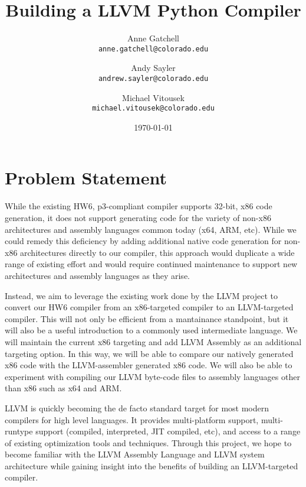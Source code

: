 \documentclass[11pt]{article}
\begin{document}
\title{
  Building a LLVM Python Compiler
}

\author{
  Anne Gatchell    \\ \texttt{anne.gatchell@colorado.edu} \and
  Andy Sayler      \\ \texttt{andrew.sayler@colorado.edu} \and
  Michael Vitousek \\ \texttt{michael.vitousek@colorado.edu}
}

\date{\today}

\maketitle

\section{Problem Statement}

While the existing HW6, p3-compliant compiler supports 32-bit, x86
code generation, it does not support generating code for the variety
of non-x86 architectures and assembly languages common today (x64,
ARM, etc). While we could remedy this deficiency by adding additional
native code generation for non-x86 architectures directly to our
compiler, this approach would duplicate a wide range of existing
effort and would require continued maintenance to support new
architectures and assembly languages as they arise.

Instead, we aim to leverage the existing work done by the LLVM project
\cite{llvm.org} to convert our HW6 compiler from an x86-targeted
compiler to an LLVM-targeted compiler. This will not only be efficient
from a mantainance standpoint, but it will also be a useful
introduction to a commonly used intermediate language. We will
maintain the current x86 targeting and add LLVM
Assembly\cite{lattner-llvmlangref} as an additional targeting
option. In this way, we will be able to compare our natively generated
x86 code with the LLVM-assembler generated x86 code. We will also be
able to experiment with compiling our LLVM byte-code files to assembly
languages other than x86 such as x64 and ARM.

LLVM is quickly becoming the de facto standard target for most modern
compilers for high level languages.  It provides multi-platform
support, multi-runtype support (compiled, interpreted, JIT compiled,
etc), and access to a range of existing optimization tools and
techniques. Through this project, we hope to become familiar with the
LLVM Assembly Language and LLVM system architecture while gaining
insight into the benefits of building an LLVM-targeted compiler.
\end{document}
